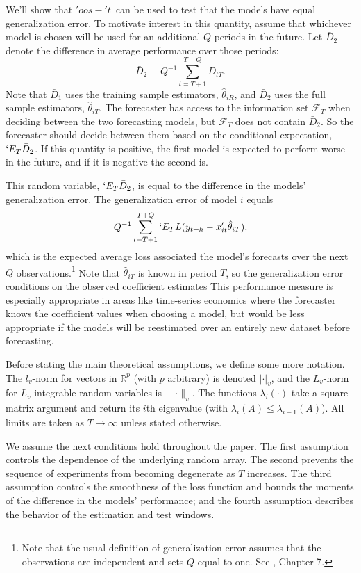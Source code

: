 \documentclass[11pt]{article}
\newcommand{\E}{`E}
\newcommand{\oost}{\ensuremath{'oos-'t}}
\newcommand{\h}{h}
\renewcommand{\Re}{\ensuremath{\mathbb{R}}}
\begin{document}
We'll show that \oost\ can be used to test that the models have equal
generalization error.  To motivate interest in this
quantity, assume that whichever model is chosen will be used for an
additional $Q$ periods in the future.  Let $\bar D_2$ denote the
difference in average performance over those periods:
\[
\bar D_2 \equiv Q^{-1} \sum_{t=T+1}^{T+Q} D_{tT}.
\]
Note that $\bar D_1$ uses the training sample estimators,
$\hat\theta_{iR}$, and $\bar D_2$ uses the full sample estimators,
$\hat\theta_{iT}$.  The forecaster has access to the information set
$\mathcal{F}_T$ when deciding between the two forecasting models, but
$\mathcal{F}_T$ does not contain $\bar D_2$.  So the forecaster should
decide between them based on the conditional expectation, $\E_T
\bar{D}_2$. If this quantity is positive, the first model is expected
to perform worse in the future, and if it is negative the second is.

This random variable, $\E_T \bar{D}_2$, is equal to the difference in
the models' generalization error.  The generalization error of model
$i$ equals
\begin{equation*}
  Q^{-1} \sum_{t=T+1}^{T+Q} \E_T L(y_{t+\h} - x_{it}'\hat{\theta}_{iT}),
\end{equation*}
which is the expected average loss associated the model's forecasts
over the next $Q$ observations.\footnote{Note that the usual
  definition of generalization error assumes that the observations are
  independent and sets $Q$ equal to one.  See
  \citet{elemstatlearning}, Chapter 7.}  Note that $\hat{\theta}_{iT}$ is known
in period $T$, so the generalization error conditions on the observed
coefficient estimates This performance measure is especially
appropriate in areas like time-series economics where the forecaster
knows the coefficient values when choosing a model, but would be less
appropriate if the models will be reestimated over an entirely new
dataset before forecasting.

Before stating the main theoretical assumptions, we define some more
notation.  The $l_v$-norm for vectors in $\Re^p$ (with $p$ arbitrary)
is denoted $\lvert \cdot \rvert_v$, and the $L_v$-norm for
$L_v$-integrable random variables is $\lVert \cdot \rVert_v$.  The
functions $\lambda_i(\cdot)$ take a square-matrix argument and return
its $i$th eigenvalue (with $\lambda_{i}(A) \leq \lambda_{i+1}(A)$).
All limits are taken as $T \to \infty$ unless stated otherwise.
 
We assume the next conditions hold throughout the paper.  The first
assumption controls the dependence of the underlying random array.
The second prevents the sequence of experiments from becoming
degenerate as $T$ increases.  The third assumption controls the
smoothness of the loss function and bounds the moments of the
difference in the models' performance; and the fourth assumption
describes the behavior of the estimation and test windows.
\end{document}
